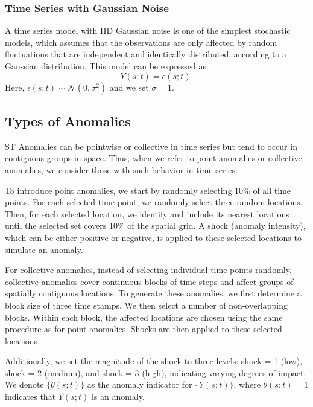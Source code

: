 \documentclass[11pt]{article}
\begin{document}
\subsubsection*{Time Series with Gaussian Noise}
A time series model with IID Gaussian noise is one of the simplest stochastic models, which assumes that the observations are only affected by random fluctuations that are independent and identically distributed, according to a Gaussian distribution. This model can be expressed as:
\begin{equation}
	Y(s;t) = \epsilon(s;t).
\end{equation}
Here, $\epsilon(s;t) \sim \mathcal{N}(0, \sigma^2)$ and we set $\sigma=1$.



\subsection{Types of Anomalies}
ST Anomalies can be pointwise or collective in time series but tend to occur in contiguous groups in space. Thus, when we refer to point anomalies or collective anomalies, we consider those with such behavior in time series. 

To introduce point anomalies, we start by randomly selecting $10\%$ of all time points. For each selected time point, we randomly select three random locations. Then, for each selected location, we identify and include its nearest locations until the selected set covers 10\% of the spatial grid. A shock (anomaly intensity), which can be either positive or negative, is applied to these selected locations to simulate an anomaly.


For collective anomalies, instead of selecting individual time points randomly, collective anomalies cover continuous blocks of time steps and affect groups of spatially contiguous locations. To generate these anomalies, we first determine a block size of three time stamps. We then select a number of non-overlapping blocks. Within each block, the affected locations are chosen using the same procedure as for point anomalies. Shocks are then applied to these selected locations.

Additionally, we set the magnitude of the shock to three levels: shock = 1 (low), shock = 2 (medium), and shock = 3 (high), indicating varying degrees of impact. We denote $\{\theta(s;t)\}$ as the anomaly indicator for $\{Y(s;t)\}$, where $\theta(s;t) = 1$ indicates that $Y(s;t)$ is an anomaly.
\end{document}
